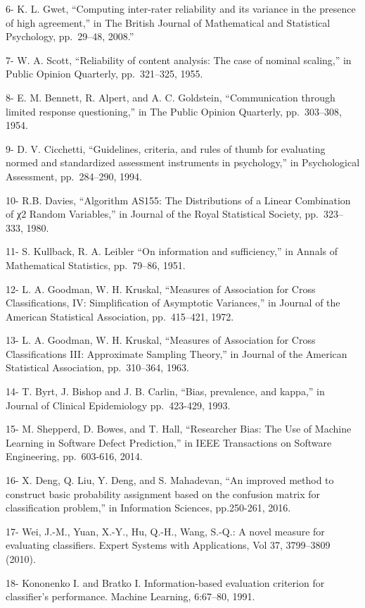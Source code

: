 \documentclass[11pt]{article}
\begin{document}
6- K. L. Gwet, ``Computing inter-rater reliability and its variance in
the presence of high agreement,'' in The British Journal of Mathematical
and Statistical Psychology, pp.~29--48, 2008.''

7- W. A. Scott, ``Reliability of content analysis: The case of nominal
scaling,'' in Public Opinion Quarterly, pp.~321--325, 1955.

8- E. M. Bennett, R. Alpert, and A. C. Goldstein, ``Communication
through limited response questioning,'' in The Public Opinion Quarterly,
pp.~303--308, 1954.

9- D. V. Cicchetti, ``Guidelines, criteria, and rules of thumb for
evaluating normed and standardized assessment instruments in
psychology,'' in Psychological Assessment, pp.~284--290, 1994.

10- R.B. Davies, ``Algorithm AS155: The Distributions of a Linear
Combination of χ2 Random Variables,'' in Journal of the Royal
Statistical Society, pp.~323--333, 1980.

11- S. Kullback, R. A. Leibler ``On information and sufficiency,'' in
Annals of Mathematical Statistics, pp.~79--86, 1951.

12- L. A. Goodman, W. H. Kruskal, ``Measures of Association for Cross
Classifications, IV: Simplification of Asymptotic Variances,'' in
Journal of the American Statistical Association, pp.~415--421, 1972.

13- L. A. Goodman, W. H. Kruskal, ``Measures of Association for Cross
Classifications III: Approximate Sampling Theory,'' in Journal of the
American Statistical Association, pp.~310--364, 1963.

14- T. Byrt, J. Bishop and J. B. Carlin, ``Bias, prevalence, and
kappa,'' in Journal of Clinical Epidemiology pp.~423-429, 1993.

15- M. Shepperd, D. Bowes, and T. Hall, ``Researcher Bias: The Use of
Machine Learning in Software Defect Prediction,'' in IEEE Transactions
on Software Engineering, pp.~603-616, 2014.

16- X. Deng, Q. Liu, Y. Deng, and S. Mahadevan, ``An improved method to
construct basic probability assignment based on the confusion matrix for
classification problem,'' in Information Sciences, pp.250-261, 2016.

17- Wei, J.-M., Yuan, X.-Y., Hu, Q.-H., Wang, S.-Q.: A novel measure for
evaluating classifiers. Expert Systems with Applications, Vol 37,
3799--3809 (2010).

18- Kononenko I. and Bratko I. Information-based evaluation criterion
for classifier's performance. Machine Learning, 6:67--80, 1991.
\end{document}

